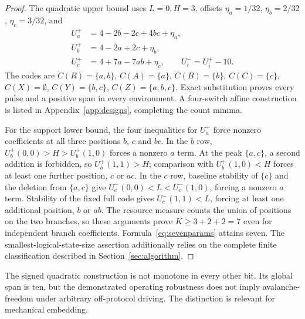 \documentclass[12pt,letterpaper]{article}
\theoremstyle{definition}\newtheorem{definition}[theorem]{Definition}
\theoremstyle{remark}\newtheorem{remark}[theorem]{Remark}
\begin{document}
\begin{proof}
The quadratic upper bound uses $L=0,H=3$, offsets $\eta_a=1/32$, $\eta_b=2/32$, $\eta_c=3/32$, and
\begin{align}\label{eq:sevenparams}
 U_a^+&=4-2b-2c+4bc+\eta_a,\\
 U_b^+&=4-2a+2c+\eta_b,\\
 U_c^+&=4+7a-7ab+\eta_c,\qquad U_i^-=U_i^+-10.\nonumber
\end{align}
The codes are $C(R)=\{a,b\}$, $C(A)=\{a\}$, $C(B)=\{b\}$, $C(C)=\{c\}$, $C(X)=\emptyset$, $C(Y)=\{b,c\}$, $C(Z)=\{a,b,c\}$. Exact substitution proves every pulse and a positive span in every environment. A four-switch affine construction is listed in Appendix~\ref{app:designs}, completing the count minima.

For the support lower bound, the four inequalities for $U_a^+$ force nonzero coefficients at all three positions $b$, $c$ and $bc$. In the $b$ row, $U_b^+(0,0)>H>U_b^+(1,0)$ forces a nonzero $a$ term. At the peak $\{a,c\}$, a second addition is forbidden, so $U_b^+(1,1)>H$; comparison with $U_b^+(1,0)<H$ forces at least one further position, $c$ or $ac$. In the $c$ row, baseline stability of $\{c\}$ and the deletion from $\{a,c\}$ give $U_c^-(0,0)<L<U_c^-(1,0)$, forcing a nonzero $a$ term. Stability of the fixed full code gives $U_c^-(1,1)<L$, forcing at least one additional position, $b$ or $ab$. The resource measure counts the union of positions on the two branches, so these arguments prove $K\ge3+2+2=7$ even for independent branch coefficients. Formula~\eqref{eq:sevenparams} attains seven. The smallest-logical-state-size assertion additionally relies on the complete finite classification described in Section~\ref{sec:algorithm}.
\end{proof}

The signed quadratic construction is not monotone in every other bit. Its global span is ten, but the demonstrated operating robustness does not imply avalanche-freedom under arbitrary off-protocol driving. The distinction is relevant for mechanical embedding.
\end{document}
